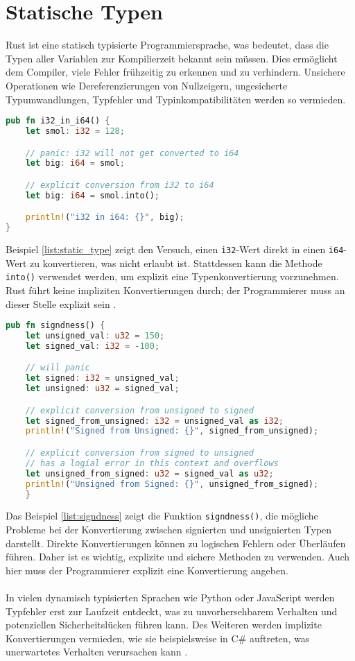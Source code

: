 
\chapter{Statische Typen}

Rust ist eine statisch typisierte Programmiersprache, was bedeutet, dass die Typen aller Variablen zur Kompilierzeit bekannt sein müssen. 
Dies ermöglicht dem Compiler, viele Fehler frühzeitig zu erkennen und zu verhindern. 
Unsichere Operationen wie Dereferenzierungen von Nullzeigern, ungesicherte Typumwandlungen, Typfehler und Typinkompatibilitäten werden so vermieden.
\begin{lstlisting}[language=Rust, caption={i32 in i64}, label=list:static_type]
pub fn i32_in_i64() {
    let smol: i32 = 128;

    // panic: i32 will not get converted to i64
    let big: i64 = smol;

    // explicit conversion from i32 to i64 
    let big: i64 = smol.into();

    println!("i32 in i64: {}", big);
}
\end{lstlisting}

\noindent
Beispiel \ref{list:static_type} zeigt den Versuch, einen \texttt{i32}-Wert direkt in einen \texttt{i64}-Wert zu konvertieren, was nicht erlaubt ist. 
Stattdessen kann die Methode \texttt{into()} verwendet werden, um explizit eine Typenkonvertierung vorzunehmen. 
Rust führt keine impliziten Konvertierungen durch; der Programmierer muss an dieser Stelle explizit sein \cite[Kapitel 1, Types]{drysdale2024}.

\begin{lstlisting}[language=Rust, caption={Signiertheit}, label=list:signdness]
pub fn signdness() {
    let unsigned_val: u32 = 150;
    let signed_val: i32 = -100;

    // will panic 
    let signed: i32 = unsigned_val;
    let unsigned: u32 = signed_val;

    // explicit conversion from unsigned to signed
    let signed_from_unsigned: i32 = unsigned_val as i32;
    println!("Signed from Unsigned: {}", signed_from_unsigned);

    // explicit conversion from signed to unsigned
    // has a logial error in this context and overflows
    let unsigned_from_signed: u32 = signed_val as u32;
    println!("Unsigned from Signed: {}", unsigned_from_signed); 
    }
\end{lstlisting}
\noindent
Das Beispiel \ref{list:signdness} zeigt die Funktion \texttt{signdness()}, die mögliche Probleme bei der Konvertierung zwischen signierten und unsignierten Typen darstellt. 
Direkte Konvertierungen können zu logischen Fehlern oder Überläufen führen. 
Daher ist es wichtig, explizite und sichere Methoden zu verwenden. 
Auch hier muss der Programmierer explizit eine Konvertierung angeben.\\
\\
In vielen dynamisch typisierten Sprachen wie Python oder JavaScript werden Typfehler erst zur Laufzeit entdeckt, was zu unvorhersehbarem Verhalten und potenziellen Sicherheitslücken führen kann. 
Des Weiteren werden implizite Konvertierungen vermieden, wie sie beispielsweise in C\# auftreten, was unerwartetes Verhalten verursachen kann \cite[Kapitel 1. Types]{drysdale2024}.
